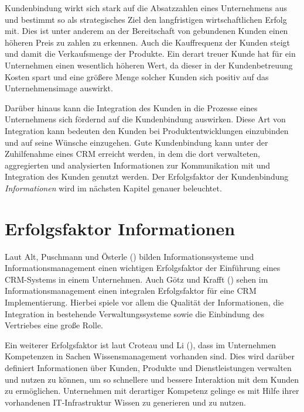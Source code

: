 Kundenbindung wirkt sich stark auf die Absatzzahlen eines Unternehmens aus und bestimmt so als strategisches Ziel den langfristigen wirtschaftlichen Erfolg mit. \cite[S.17-18]{Homburg.2013}
Dies ist unter anderem an der Bereitschaft von gebundenen Kunden einen höheren Preis zu zahlen zu erkennen. \cite[S. 18]{Homburg.2013} Auch die Kauffrequenz der Kunden steigt und damit die Verkaufsmenge der Produkte. Ein derart treuer Kunde hat für ein Unternehmen einen wesentlich höheren Wert, da dieser in der Kundenbetreuung Kosten spart und eine größere Menge solcher Kunden sich positiv auf das Unternehmensimage auswirkt. \cite[S.18-19]{Homburg.2013}

Darüber hinaus kann die Integration des Kunden in die Prozesse eines Unternehmens  sich fördernd auf die Kundenbindung auswirken. Diese Art von Integration kann bedeuten den Kunden bei Produktentwicklungen einzubinden und auf seine Wünsche einzugehen. \cite[S.157]{Buttgen.2013}
Gute Kundenbindung kann unter der Zuhilfenahme eines \ac{CRM} erreicht werden, in dem die dort verwalteten, aggregierten und analysierten Informationen zur Kommunikation mit und Integration des Kunden genutzt werden. Der Erfolgsfaktor der Kundenbindung \emph{Informationen} wird im nächsten Kapitel genauer beleuchtet.

\section{Erfolgsfaktor Informationen}
\label{cha:CRM_Info}
Laut Alt, Puschmann und Österle (\citeyear[S.2]{Alt.2005}) bilden Informationssysteme und Informationsmanagement einen wichtigen Erfolgsfaktor der Einführung eines \ac{CRM}-Systems in einem Unternehmen. Auch Götz und Krafft (\citeyear[S.591]{Gotz.2013}) sehen im Informationsmanagement einen integralen Erfolgsfaktor für eine \ac{CRM} Implementierung. Hierbei spiele vor allem die Qualität der Informationen, die Integration in bestehende Verwaltungssysteme sowie die Einbindung des Vertriebes eine große Rolle. 

Ein weiterer Erfolgsfaktor ist laut Croteau und Li (\citeyear{Croteau.2003}), dass im Unternehmen Kompetenzen in Sachen Wissensmanagement vorhanden sind. Dies wird darüber definiert Informationen über Kunden, Produkte und Dienstleistungen verwalten und nutzen zu können, um so schnellere und bessere Interaktion mit dem Kunden zu ermöglichen. Unternehmen mit derartiger Kompetenz gelinge es mit Hilfe ihrer vorhandenen IT-Infrastruktur Wissen zu generieren und zu nutzen.

